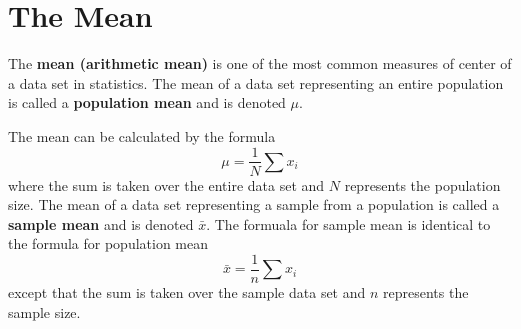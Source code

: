 \documentclass{article}
\theoremstyle{definition}
\begin{document}
\section{The Mean}
\begin{definition}
    The \textbf{mean (arithmetic mean)} is one of the most common measures of 
    center of a data set in statistics. The mean of a data set representing an 
    entire population is called a \textbf{population mean} and is denoted $\mu$. 
\end{definition}
\noindent The mean can be calculated by the formula 
\[
    \mu = \frac{1}{N}\sum x_i  
\]
where the sum is taken over the entire data set and $N$ represents the
population size. The mean of a data set representing a sample from a population 
is called a \textbf{sample mean} and is denoted $\bar{x}$. The formuala for 
sample mean is identical to the formula for population mean 
\[
    \bar{x} = \frac{1}{n}\sum x_i
\]
except that the sum is taken over the sample data set and $n$ represents the
sample size.
\end{document}
